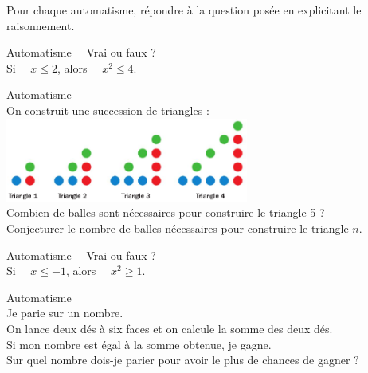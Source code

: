 \documentclass[a4paper,12pt,french]{article}
\makeatletter
\newcounter{autNum}
\newcommand{\aut}[1]
{
	\addtocounter{autNum}{1}
	{\titlefont\color{bleufonce@color}\Large Automatisme\ \theautNum\ \normalsize{#1}}\smallskip	
}
\makeatother
\begin{document}

\setlength{\columnsep}{50pt}
\setlength{\columnseprule}{1pt}

Pour chaque automatisme, répondre à la question posée en explicitant le raisonnement.\\

\begin{multicols}{2}

	
	\aut{ Vrai ou faux ?}\\
	Si $\quad x\leqslant2$, \quad alors $\quad x^2\leqslant4$.
	\vspace{1.5cm}
	
	\aut{}\\
	On construit une succession de triangles :\\
	\includegraphics[width=8cm]{triangles}\\
	
	Combien de balles sont nécessaires pour construire le triangle 5 ?\\
	
	Conjecturer le nombre de balles nécessaires pour construire le triangle $n$.
	\vspace{1.5cm}
	
	\aut{ Vrai ou faux ?}\\
	Si $\quad x\leqslant-1$, \quad alors $\quad x^2\geqslant1$.
	\vspace{1.5cm}
	
	\aut{}\\
	Je parie sur un nombre.\\
	On lance deux dés à six faces et on calcule la somme des deux dés.\\
	Si mon nombre est égal à la somme obtenue, je gagne.\\
	Sur quel nombre dois-je parier pour avoir le plus de chances de gagner ?
	
	\vspace{1.5cm}
	

\end{multicols}
\end{document}
